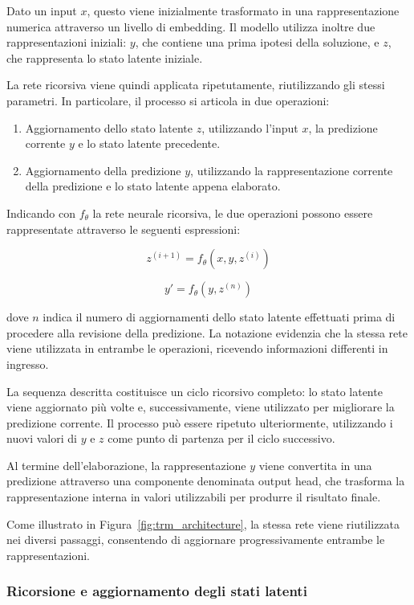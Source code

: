 Dato un input \(x\), questo viene inizialmente trasformato in una rappresentazione numerica attraverso un livello di embedding. Il modello utilizza inoltre due rappresentazioni iniziali: \(y\), che contiene una prima ipotesi della soluzione, e \(z\), che rappresenta lo stato latente iniziale.

La rete ricorsiva viene quindi applicata ripetutamente, riutilizzando gli stessi parametri. In particolare, il processo si articola in due operazioni:

\begin{enumerate}
    \item Aggiornamento dello stato latente \(z\), utilizzando l'input \(x\), la predizione corrente \(y\) e lo stato latente precedente.
    \item Aggiornamento della predizione \(y\), utilizzando la rappresentazione corrente della predizione e lo stato latente appena elaborato.
\end{enumerate}

Indicando con \(f_\theta\) la rete neurale ricorsiva, le due operazioni possono essere rappresentate attraverso le seguenti espressioni:

\[
    z^{(i+1)} = f_\theta(x, y, z^{(i)})
\]

\[
    y' = f_\theta(y, z^{(n)})
\]

dove \(n\) indica il numero di aggiornamenti dello stato latente effettuati prima di procedere alla revisione della predizione. La notazione evidenzia che la stessa rete viene utilizzata in entrambe le operazioni, ricevendo informazioni differenti in ingresso.

La sequenza descritta costituisce un ciclo ricorsivo completo: lo stato latente viene aggiornato più volte e, successivamente, viene utilizzato per migliorare la predizione corrente. Il processo può essere ripetuto ulteriormente, utilizzando i nuovi valori di \(y\) e \(z\) come punto di partenza per il ciclo successivo.

Al termine dell'elaborazione, la rappresentazione \(y\) viene convertita in una predizione attraverso una componente denominata output head, che trasforma la rappresentazione interna in valori utilizzabili per produrre il risultato finale.

Come illustrato in Figura~\ref{fig:trm_architecture}, la stessa rete viene riutilizzata nei diversi passaggi, consentendo di aggiornare progressivamente entrambe le rappresentazioni.

\subsubsection{Ricorsione e aggiornamento degli stati latenti}

